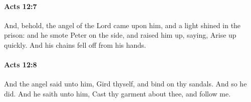 		\paragraph{Acts 12:7} %
			\label{ACTS-12-7}

			And, behold, the angel of the Lord came upon him, and a light shined in the prison: and he smote Peter on the side, and raised him up, saying, Arise up quickly.  And his chains fell off from his hands.

			\begin{framed}
			\scriptsize
				\begin{compactdesc}
					\item[SBLG] 
				\end{compactdesc}
			\end{framed}

		\paragraph{Acts 12:8} %
			\label{ACTS-12-8}

			And the angel said unto him, Gird thyself, and bind on thy sandals.  And so he did.  And he saith unto him, Cast thy garment about thee, and follow me.

